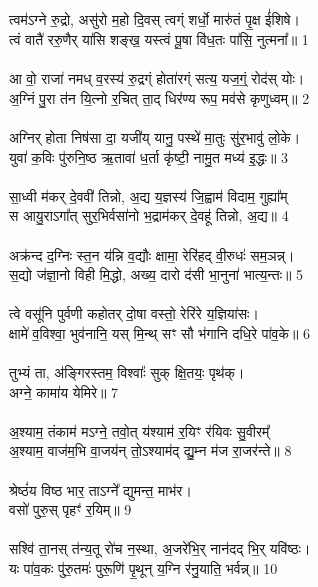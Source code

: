 \subsection{}
त्वम॑ऽग्ने रु॒द्रो, असु॑रो म॒हो दि॒वस् त्वग्ं शर्धो॒ मारु॑तं पृ॒क्ष ई॑शिषे।\\
त्वं वातै॑ ररु॒णैर् या॑सि शङ्ख॒ यस्त्वं पू॒षा वि॑ध॒तः पा॑सि॒ नुत्मना᳚॥ 1\\
\\
आ वो॒ राजा॑ नमध् व॒रस्य॑ रु॒द्रग्ं होता॑रग्ं सत्य॒ यज॒ग्ं॒ रोद॑स् योः।\\
अ॒ग्निं पु॒रा त॑न यि॒त्नो र॒चित् ता॒द् धिर॑ण्य रूप॒ मव॑से कृणुध्वम्॥ 2\\
\\
अग्निर् होता निष॑सा दा॒ यजी॑य् यानु॒ पस्थे॑ मा॒तुः सु॑र॒भावु॑ लो॒के। \\
युवा॑ क॒विः पु॑रुनि॒ष्ठ ऋ॒तावा॑ ध॒र्ता  कृ॑ष्टी॒ नामु॒त मध्य॑ इ॒द्धः॥ 3\\
\\
सा॒ध्वी म॑कर् दे॒ववी॑ तिन्नो, अ॒द्य य॒ज्ञस्य॑ जि॒ह्वाम॑ विदाम॒ गुह्या᳚म्\\
स आयु॒राऽगा᳚त् सुर॒भिर्वसा॑नो भ॒द्राम॑कर् दे॒वहू॑ तिन्नो, अ॒द्य॥ 4\\
\\
अक्र॑न्द द॒ग्निः स्त॒न य॑न्नि व॒द्यौः क्षामा॒ रेरि॑हद् वी॒रुधः॑ सम॒ञन्न्।\\
स॒द्यो ज॑ज्ञा॒नो विही मि॒द्धो, अख्य॒ दारो द॑सी भा॒नुना॑ भात्य॒न्तः॥ 5\\
\\
त्वे वसू॑नि पुर्वणी कहोतर् दो॒षा वस्तो॒ रेरि॑रे य॒ज्ञिया॑सः।\\
क्षामे॑ व॒विश्वा॒ भुव॑नानि॒ यस् मि॒न्थ् सꣳ सौ भ॑गानि दधि॒रे पा॑व॒के॥ 6\\
\\
तुभ्यं ता, अ॑ङ्गिरस्तम॒ विश्वाः᳚ सुक् क्षि॒तयः॒ पृथ॑क्।\\
अग्ने॒ कामा॑य येमिरे॥ 7\\
\\
अ॒श्याम॒ तंकाम॑ मऽग्ने॒ तवो॒त् य॑श्याम॑ र॒यिꣳ र॑यिवः सु॒वीरम्᳚\\
अ॒श्याम॒ वाज॑म॒भि वा॒जय॑न् तो॒ऽश्याम॑द्  द्यु॒म्न म॑ज रा॒जर॑न्ते॥ 8\\
\\
श्रेष्ठं॑य विष्ठ भार॒ ताऽग्ने᳚ द्युमन्त॒ माभ॑र।\\
वसो॑ पुरु॒स् पृहꣳ॑ र॒यिम्॥ 9\\
 \\
सश्वि॑ ता॒नस् त॑न्य॒तू रो॑च न॒स्था, अ॒जरे॑भि॒र् नान॑दद् भि॒र् यवि॑ष्ठः।\\
यः पा॑व॒कः पु॑रु॒तमः॑ पुरू॒णि॑ पृ॒थून् य॒ग्नि र॑नु॒याति॒ भर्वन्न्॥ 10\\
